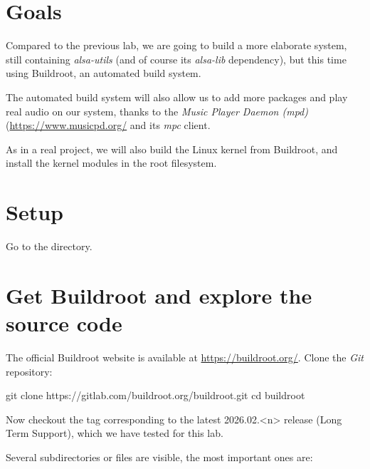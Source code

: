 
\section{Goals}

Compared to the previous lab, we are going to build a more elaborate
system, still containing {\em alsa-utils} (and of course its {\em
alsa-lib} dependency), but this time using Buildroot,
an automated build system.

The automated build system will also allow us to add more packages
and play real audio on our system, thanks to the {\em Music Player
Daemon (mpd)} (\url{https://www.musicpd.org/} and its {\em mpc} client.

As in a real project, we will also build the Linux kernel from
Buildroot, and install the kernel modules in the root filesystem.

\section{Setup}

Go to the  directory.

\section{Get Buildroot and explore the source code}

The official Buildroot website is available at
\url{https://buildroot.org/}. Clone the {\em Git} repository:

\begin{bashinput}
git clone https://gitlab.com/buildroot.org/buildroot.git
cd buildroot
\end{bashinput}

Now checkout the tag corresponding to the latest 2026.02.<n> release (Long
Term Support), which we have tested for this lab.

Several subdirectories or files are visible, the most important ones
are:

